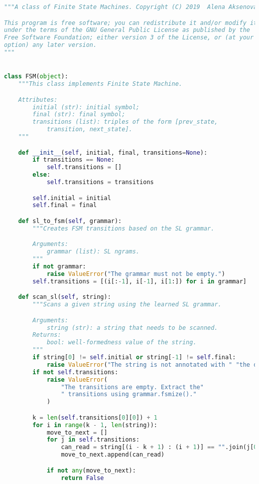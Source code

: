 \begin{lstlisting}[language=Python]
"""A class of Finite State Machines. Copyright (C) 2019  Alena Aksenova.

This program is free software; you can redistribute it and/or modify it
under the terms of the GNU General Public License as published by the
Free Software Foundation; either version 3 of the License, or (at your
option) any later version.
"""


class FSM(object):
    """This class implements Finite State Machine.

    Attributes:
        initial (str): initial symbol;
        final (str): final symbol;
        transitions (list): triples of the form [prev_state,
            transition, next_state].
    """

    def __init__(self, initial, final, transitions=None):
        if transitions == None:
            self.transitions = []
        else:
            self.transitions = transitions

        self.initial = initial
        self.final = final

    def sl_to_fsm(self, grammar):
        """Creates FSM transitions based on the SL grammar.

        Arguments:
            grammar (list): SL ngrams.
        """
        if not grammar:
            raise ValueError("The grammar must not be empty.")
        self.transitions = [(i[:-1], i[-1], i[1:]) for i in grammar]

    def scan_sl(self, string):
        """Scans a given string using the learned SL grammar.

        Arguments:
            string (str): a string that needs to be scanned.
        Returns:
            bool: well-formedness value of the string.
        """
        if string[0] != self.initial or string[-1] != self.final:
            raise ValueError("The string is not annotated with " "the delimeters.")
        if not self.transitions:
            raise ValueError(
                "The transitions are empty. Extract the"
                " transitions using grammar.fsmize()."
            )

        k = len(self.transitions[0][0]) + 1
        for i in range(k - 1, len(string)):
            move_to_next = []
            for j in self.transitions:
                can_read = string[(i - k + 1) : (i + 1)] == "".join(j[0]) + j[1]
                move_to_next.append(can_read)

            if not any(move_to_next):
                return False


\end{lstlisting}
